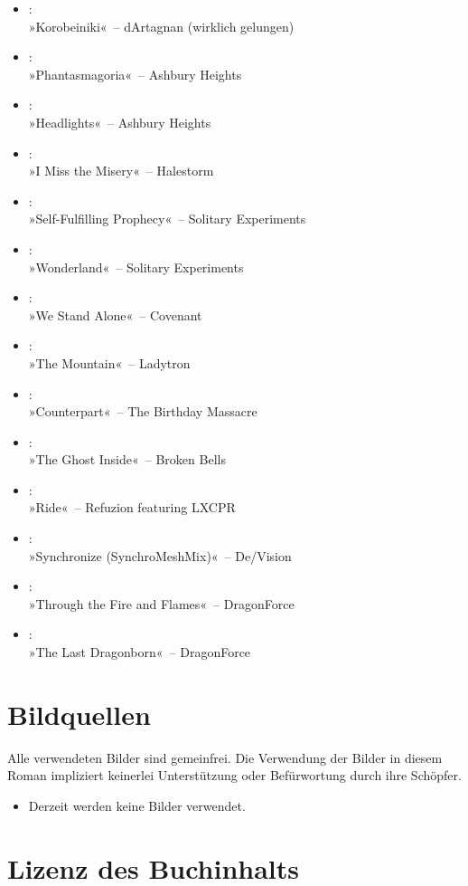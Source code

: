 \begin{itemize}
    \item :\\ »Korobeiniki«~– dArtagnan (wirklich gelungen)
    \item :\\ »Phantasmagoria«~– Ashbury Heights
    \item :\\ »Headlights«~– Ashbury Heights
    \item :\\ »I Miss the Misery«~– Halestorm
    \item :\\ »Self-Fulfilling Prophecy«~– Solitary Experiments
    \item :\\ »Wonderland«~– Solitary Experiments
    \item :\\ »We Stand Alone«~– Covenant
    \item :\\ »The Mountain«~– Ladytron
    \item :\\ »Counterpart«~– The Birthday Massacre
    \item :\\ »The Ghost Inside«~– Broken Bells
    \item :\\ »Ride«~– Refuzion featuring LXCPR
    \item :\\ »Synchronize (SynchroMeshMix)«~– De/Vision
    \item :\\ »Through the Fire and Flames«~– DragonForce
    \item :\\ »The Last Dragonborn«~– DragonForce
\end{itemize}


\chapter{Bildquellen}

Alle verwendeten Bilder sind gemeinfrei. Die Verwendung der Bilder in diesem Roman impliziert keinerlei Unterstützung oder Befürwortung durch ihre Schöpfer.

\begin{itemize}
    \item Derzeit werden keine Bilder verwendet.
\end{itemize}


\chapter{Lizenz des Buchinhalts}

